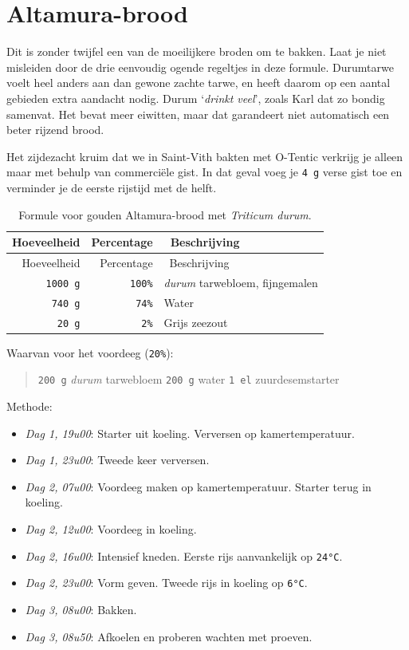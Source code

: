 \documentclass[
  11pt,
  dutch,
]{memoir}
\providecommand{\tightlist}{%
  \setlength{\itemsep}{0pt}\setlength{\parskip}{0pt}}
\begin{document}
\newpage

\hypertarget{altamura-brood}{%
\section{Altamura-brood}\label{altamura-brood}}

\label{altamurabrood}

Dit is zonder twijfel een van de moeilijkere broden om te bakken. Laat
je niet misleiden door de drie eenvoudig ogende regeltjes in deze
formule. Durumtarwe voelt heel anders aan dan gewone zachte tarwe, en
heeft daarom op een aantal gebieden extra aandacht nodig. Durum
`\emph{drinkt veel}', zoals Karl dat zo bondig samenvat. Het bevat meer
eiwitten, maar dat garandeert niet automatisch een beter rijzend brood.

Het zijdezacht kruim dat we in Saint-Vith bakten met O-Tentic verkrijg
je alleen maar met behulp van commerciële gist. In dat geval voeg je
\texttt{4\ g} verse gist toe en verminder je de eerste rijstijd met de
helft.

\begin{longtable}[]{@{}rrl@{}}
\caption{Formule voor gouden Altamura-brood met \emph{Triticum durum}.
\label{tabledurum}}\tabularnewline
\toprule
Hoeveelheid & Percentage & ~Beschrijving\tabularnewline
\midrule
\endfirsthead
\toprule
Hoeveelheid & Percentage & ~Beschrijving\tabularnewline
\midrule
\endhead
\texttt{1000\ g} & \texttt{100\%} & \emph{durum} tarwebloem,
fijngemalen\tabularnewline
\texttt{740\ g} & \texttt{74\%} & Water\tabularnewline
\texttt{20\ g} & \texttt{2\%} & Grijs zeezout\tabularnewline
\bottomrule
\end{longtable}

Waarvan voor het voordeeg (\texttt{20\%}):

\begin{quote}
\texttt{200\ g} \emph{durum} tarwebloem \newline \texttt{200\ g} water
\newline \texttt{1\ el} zuurdesemstarter
\end{quote}

Methode:

\begin{itemize}
\tightlist
\item
  \emph{Dag 1, 19u00}: Starter uit koeling. Verversen op
  kamertemperatuur.
\item
  \emph{Dag 1, 23u00}: Tweede keer verversen.
\item
  \emph{Dag 2, 07u00}: Voordeeg maken op kamertemperatuur. Starter terug
  in koeling.
\item
  \emph{Dag 2, 12u00}: Voordeeg in koeling.
\item
  \emph{Dag 2, 16u00}: Intensief kneden. Eerste rijs aanvankelijk op
  \texttt{24°C}.
\item
  \emph{Dag 2, 23u00}: Vorm geven. Tweede rijs in koeling op
  \texttt{6°C}.
\item
  \emph{Dag 3, 08u00}: Bakken.
\item
  \emph{Dag 3, 08u50}: Afkoelen en proberen wachten met proeven.
\end{itemize}
\end{document}
